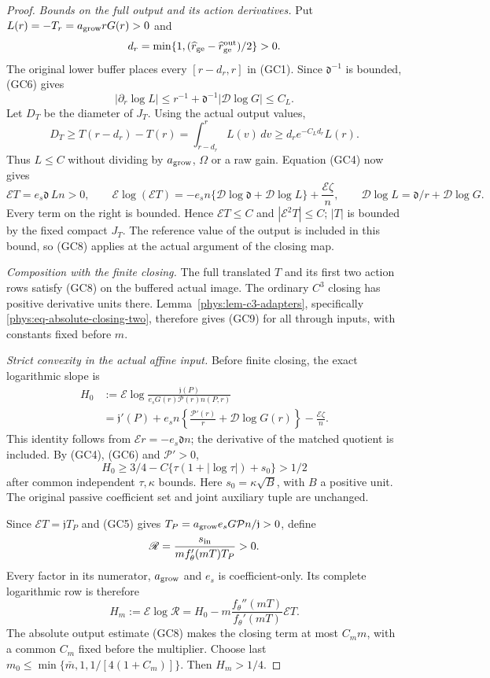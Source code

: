 \begin{proof}
\emph{Bounds on the full output and its action derivatives.}
Put $L(r)=-T_r=a_{\rm grow}rG(r)>0$ and
\[
 d_r=\min\{1,(\widehat r_{\rm ge}
              -\widehat r_{\rm ge}^{\rm out})/2\}>0 .
\]
The original lower buffer places every $[r-d_r,r]$ in (GC1).
Since $\mathfrak d^{-1}$ is bounded, (GC6) gives
\[
 |\partial_r\log L|
 \le r^{-1}+\mathfrak d^{-1}|\mathcal D\log G|\le C_L .
\]
Let $D_T$ be the diameter of $J_T$. Using the actual output values,
\[
 D_T\ge T(r-d_r)-T(r)
      =\int_{r-d_r}^rL(v)\,dv
      \ge d_re^{-C_Ld_r}L(r).
 \tag{GC11}
\]
Thus $L\le C$ without dividing by $a_{\rm grow}$, $\Omega$ or a raw gain.
Equation (GC4) now gives
\[
 \mathcal ET=e_s\mathfrak d\,Ln>0,\qquad
 \mathcal E\log(\mathcal ET)
 =-e_sn\{\mathcal D\log\mathfrak d+\mathcal D\log L\}
       +\frac{\mathcal E\zeta}{n},\qquad
 \mathcal D\log L=\mathfrak d/r+\mathcal D\log G .
 \tag{GC12}
\]
Every term on the right is bounded. Hence $\mathcal ET\le C$ and
$|\mathcal E^2T|\le C$; $|T|$ is bounded by the fixed compact $J_T$.
The reference value of the output is included in this bound, so (GC8)
applies at the actual argument of the closing map.

\emph{Composition with the finite closing.}
The full translated $T$ and its first two action rows satisfy (GC8)
on the buffered actual image. The ordinary $C^3$ closing has positive
derivative units there. Lemma~\ref{phys:lem-c3-adapters}, specifically
\eqref{phys:eq-absolute-closing-two}, therefore gives (GC9) for all
through inputs, with constants fixed before $m$.

\emph{Strict convexity in the actual affine input.}
Before finite closing, the exact logarithmic slope is
\[
 \begin{split}
 H_0
 &:=\mathcal E\log
       \frac{\mathfrak j(P)}{e_sG(r)\mathcal P(r)n(P,r)}\\
 &=\mathfrak j'(P)+e_sn
       \left\{\frac{\mathcal P'(r)}r+\mathcal D\log G(r)\right\}
       -\frac{\mathcal E\zeta}{n}.
 \end{split}
 \tag{GC14}
\]
This identity follows from $\mathcal Er=-e_s\mathfrak d n$;
the derivative of the matched quotient is included.
By (GC4), (GC6) and $\mathcal P'>0$,
\[
 H_0\ge 3/4-C\{\tau(1+|\log\tau|)+s_0\}>1/2
 \tag{GC15}
\]
after common independent $\tau,\kappa$ bounds.
Here $s_0=\kappa\sqrt B$, with $B$ a positive unit.
The original passive coefficient set and joint auxiliary tuple are
unchanged.

Since $\mathcal ET=\mathfrak j T_P$ and (GC5) gives
$T_P=a_{\rm grow}e_sG\mathcal P n/\mathfrak j>0$, define
\[
 \mathscr R=\frac{s_{\rm in}}{mf_\theta'(mT)T_P}>0 .
\]
Every factor in its numerator, $a_{\rm grow}$ and $e_s$ is
coefficient-only. Its complete logarithmic row is therefore
\[
 H_m:=\mathcal E\log\mathscr R
    =H_0-m\frac{f_\theta''(mT)}{f_\theta'(mT)}\mathcal ET .
 \tag{GC16}
\]
The absolute output estimate (GC8) makes the closing term at most
$C_m m$, with a common $C_m$ fixed before the multiplier.
Choose last
$m_0\le\min\{\bar m,1,1/[4(1+C_m)]\}$. Then $H_m>1/4$.


\end{proof}
